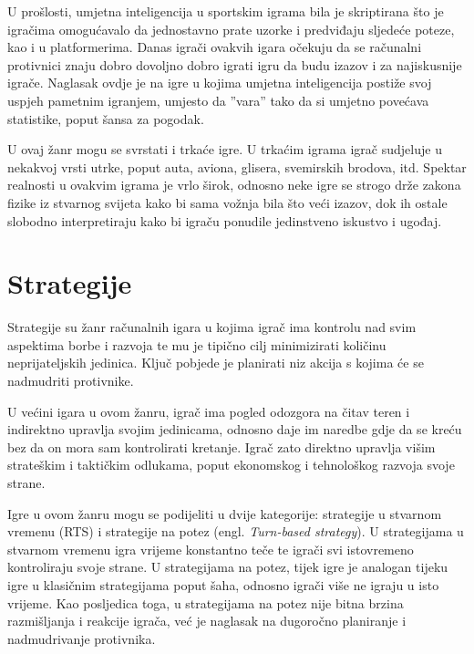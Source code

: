 \documentclass[times, utf8, zavrsni, numeric]{fer}
\begin{document}
\par U prošlosti, umjetna inteligencija u sportskim igrama bila je skriptirana što je igračima omogućavalo da jednostavno prate uzorke i predviđaju sljedeće poteze, kao i u platformerima.
Danas igrači ovakvih igara očekuju da se računalni protivnici znaju dobro dovoljno dobro igrati igru da budu izazov i za najiskusnije igrače.
Naglasak ovdje je na igre u kojima umjetna inteligencija postiže svoj uspjeh pametnim igranjem, umjesto da ''vara'' tako da si umjetno povećava statistike, poput šansa za pogodak.

\par U ovaj žanr mogu se svrstati i trkaće igre.
U trkaćim igrama igrač sudjeluje u nekakvoj vrsti utrke, poput auta, aviona, glisera, svemirskih brodova, itd.
Spektar realnosti u ovakvim igrama je vrlo širok, odnosno neke igre se strogo drže zakona fizike iz stvarnog svijeta kako bi sama vožnja bila što veći izazov, dok ih ostale slobodno interpretiraju kako bi igraču ponudile jedinstveno iskustvo i ugođaj.

\section{Strategije}

\par Strategije su žanr računalnih igara u kojima igrač ima kontrolu nad svim aspektima borbe i razvoja te mu je tipično cilj minimizirati količinu neprijateljskih jedinica.
Ključ pobjede je planirati niz akcija s kojima će se nadmudriti protivnike.

\par U većini igara u ovom žanru, igrač ima pogled odozgora na čitav teren i indirektno upravlja svojim jedinicama, odnosno daje im naredbe gdje da se kreću bez da on mora sam kontrolirati kretanje.
Igrač zato direktno upravlja višim strateškim i taktičkim odlukama, poput ekonomskog i tehnološkog razvoja svoje strane.

\par Igre u ovom žanru mogu se podijeliti u dvije kategorije: strategije u stvarnom vremenu (RTS) i strategije na potez (engl. \textit{Turn-based strategy}).
U strategijama u stvarnom vremenu igra vrijeme konstantno teče te igrači svi istovremeno kontroliraju svoje strane.
U strategijama na potez, tijek igre je analogan tijeku igre u klasičnim strategijama poput šaha, odnosno igrači više ne igraju u isto vrijeme.
Kao posljedica toga, u strategijama na potez nije bitna brzina razmišljanja i reakcije igrača, već je naglasak na dugoročno planiranje i nadmudrivanje protivnika.
\end{document}
